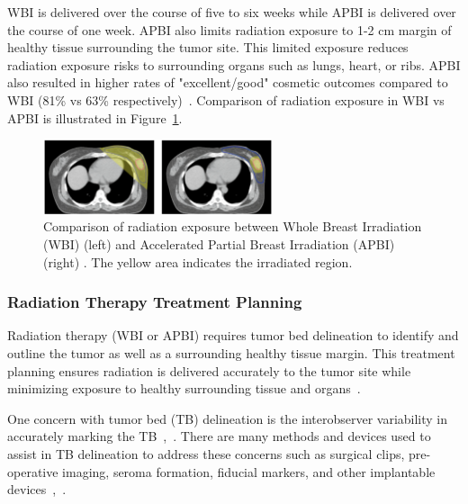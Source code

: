 WBI is delivered over the course of five to six weeks while APBI is delivered over the course of one week. APBI also limits radiation exposure to 1-2 cm margin of healthy tissue surrounding the tumor site. This limited exposure reduces radiation exposure risks to surrounding organs such as lungs, heart, or ribs. APBI also resulted in higher rates of "excellent/good" cosmetic outcomes compared to WBI (81\% vs 63\% respectively)~\cite{RefWorks:RefID:157-thomasscience}. Comparison of radiation exposure in WBI vs APBI is illustrated in Figure~\ref{fig:introduction:WBI_vs_APBI_irradiation_comparison}.

\begin{figure}[h!]
        \centering
        \includegraphics[width=0.6\textwidth]{../figs/introduction/WBI_vs_APBI_irradiation_comparison.png}
        \caption{Comparison of radiation exposure between Whole Breast Irradiation (WBI) (left) and Accelerated Partial Breast Irradiation (APBI) (right) \cite{RefWorks:RefID:157-thomasscience}. The yellow area indicates the irradiated region.}
        \label{fig:introduction:WBI_vs_APBI_irradiation_comparison}
\end{figure}

\subsubsection{Radiation Therapy Treatment Planning\label{sec:introduction:radiationtherapy:treatmentplanning}}
Radiation therapy (WBI or APBI) requires tumor bed delineation to identify and outline the tumor as well as a surrounding healthy tissue margin. This treatment planning ensures radiation is delivered accurately to the tumor site while minimizing exposure to healthy surrounding tissue and organs~\cite{RefWorks:RefID:197-den2015postlumpectomy}.

One concern with tumor bed (TB) delineation is the interobserver variability in accurately marking the TB~\cite{RefWorks:RefID:197-den2015postlumpectomy},~\cite{RefWorks:RefID:179-yang2013tumor}. There are many methods and devices used to assist in TB delineation to address these concerns such as surgical clips, pre-operative imaging, seroma formation, fiducial markers, and other implantable devices~\cite{RefWorks:RefID:179-yang2013tumor},~\cite{RefWorks:RefID:25-acree2022review}.


